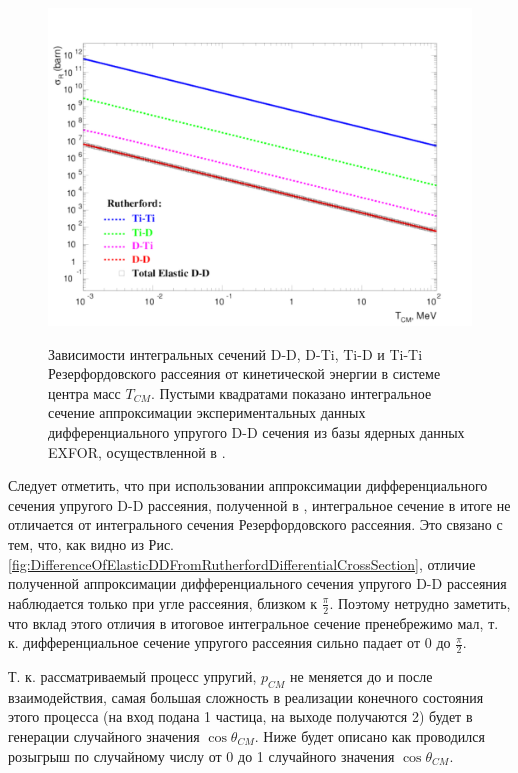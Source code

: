 \documentclass[a4paper,12pt]{article}
\begin{document}
\begin{large}
\begin{figure}[ht]
  {
     \includegraphics[width=0.99\linewidth]{images/integral_rutherford_d_ti_cross_sections.pdf}
  }
  \caption{Зависимости интегральных сечений D-D, D-Ti, Ti-D и Ti-Ti Резерфордовского рассеяния от кинетической энергии в системе центра масс $T_{CM}$.
  	Пустыми квадратами показано интегральное сечение аппроксимации экспериментальных данных дифференциального упругого D-D сечения из базы ядерных данных EXFOR, осуществленной в \cite{70/778-T}.}
  \label{fig:IntegralRutherfordDTiCrossSections}
\end{figure}

	Следует отметить, что при использовании аппроксимации дифференциального сечения упругого D-D рассеяния, полученной в \cite{70/778-T}, интегральное сечение в итоге не отличается от интегрального сечения Резерфордовского рассеяния.
	Это связано с тем, что, как видно из Рис. ~    \ref{fig:DifferenceOfElasticDDFromRutherfordDifferentialCrossSection}, отличие полученной аппроксимации дифференциального сечения упругого D-D рассеяния наблюдается только при угле рассеяния, близком к $\frac{\pi}{2}$.
	Поэтому нетрудно заметить, что вклад этого отличия в итоговое интегральное сечение пренебрежимо мал, т. к. дифференциальное сечение упругого рассеяния сильно падает от 0 до $\frac{\pi}{2}$.
	
	Т. к. рассматриваемый процесс упругий, $p_{CM}$ не меняется до и после взаимодействия, самая большая сложность в реализации конечного состояния этого процесса (на вход подана 1 частица, на выходе получаются  2) будет в генерации случайного значения $\cos{\theta_{CM}}$.
	Ниже будет описано как проводился розыгрыш по случайному числу от 0 до 1 случайного значения $\cos{\theta_{CM}}$.
	

\end{large}
\end{document}
